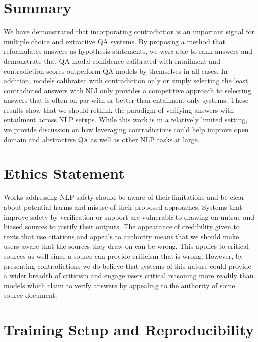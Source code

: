 \documentclass[11pt]{article}
\begin{document}
\section{Summary}
We have demonstrated that incorporating contradiction is an important signal for multiple choice and extractive QA systems. By proposing a method that reformulates answers as hypothesis statements, we were able to rank answers and demonstrate that QA model confidence calibrated with entailment and contradiction scores outperform QA models by themselves in all cases. In addition, models calibrated with contradiction only or simply selecting the least contradicted answers with NLI only provides a competitive approach to selecting answers that is often on par with or better than entailment only systems. These results show that we should rethink the paradigm of verifying answers with entailment across NLP setups. While this work is in a relatively limited setting, we provide discussion on how leveraging contradictions could help improve open domain and abstractive QA as well as other NLP tasks at large.

\section{Ethics Statement}
Works addressing NLP safety should be aware of their limitations and be clear about potential harms and misuse of their proposed approaches. Systems that improve safety by verification or support are vulnerable to drawing on untrue and biased sources to justify their outputs. The appearance of credibility given to texts that use citations and appeals to authority means that we should make users aware that the sources they draw on can be wrong. This applies to critical sources as well since a source can provide criticism that is wrong. However, by presenting contradictions we do believe that systems of this nature could provide a wider breadth of criticism and engage users critical reasoning more readily than models which claim to verify answers by appealing to the authority of some source document.




\appendix

\section{Training Setup and Reproducibility}
\label{sec:appendix}
\end{document}

